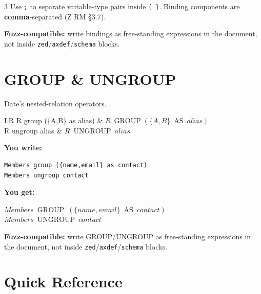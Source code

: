 \documentclass[10pt,landscape,a4paper]{article}
\newenvironment{exwrite}%
  {\par\noindent\scriptsize\textbf{You write:}\par\vspace{0pt}\scriptsize}%
  {\vspace{1pt}}
\newenvironment{exget}%
  {\par\noindent\scriptsize\textbf{You get:}\par\vspace{0pt}\small}%
  {\par\vspace{3pt}}
\begin{document}
\begin{multicols}{3}
{\scriptsize Use \texttt{;} to separate variable-type pairs inside \texttt{\{ \}}. Binding components are \textbf{comma}-separated (Z RM §3.7).}

\smallskip
{\scriptsize\textbf{Fuzz-compatible:} write bindings as free-standing expressions in the document, not inside \texttt{zed}/\texttt{axdef}/\texttt{schema} blocks.}

\section{GROUP \& UNGROUP}

{\scriptsize Date's nested-relation operators.}

\begin{tabularx}{\columnwidth}{LR}
R group (\{A,B\} as alias) & $R\ \mathop{\mathrm{GROUP}} (\{A,B\}\ \mathop{\mathrm{AS}}\ alias)$ \\
R ungroup alias    & $R\ \mathop{\mathrm{UNGROUP}}\ alias$ \\
\end{tabularx}

\begin{exwrite}
\begin{verbatim}
Members group ({name,email} as contact)
Members ungroup contact
\end{verbatim}
\end{exwrite}
\begin{exget}
\begin{center}
$Members\ \mathop{\mathrm{GROUP}}\ (\{name,email\}\ \mathop{\mathrm{AS}}\ contact)$\\[3pt]
$Members\ \mathop{\mathrm{UNGROUP}}\ contact$
\end{center}
\end{exget}

{\scriptsize\textbf{Fuzz-compatible:} write GROUP/UNGROUP as free-standing expressions in the document, not inside \texttt{zed}/\texttt{axdef}/\texttt{schema} blocks.}

\section{Quick Reference}


\end{multicols}
\end{document}
